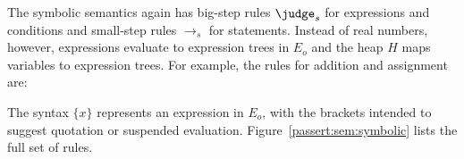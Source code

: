 The symbolic semantics again has big-step rules $\judge_s$ for
expressions and conditions and small-step rules $\to_s$ for
statements. Instead of real numbers, however, expressions evaluate to
expression trees in $E_o$ and the heap $H$ maps variables to
expression trees.  For example, the rules for addition and assignment
are:
%
%
The syntax $\{ x \}$ represents an expression in $E_o$, with the brackets
intended to
suggest quotation or suspended evaluation.
Figure~\ref{passert:sem:symbolic} lists the full set of rules.

